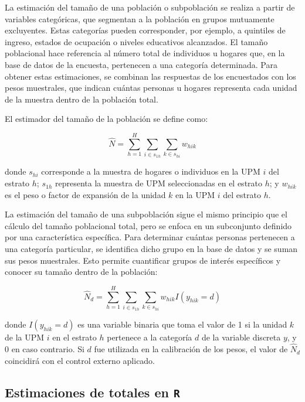 \documentclass[
  12pt,
]{book}
\begin{document}
La estimación del tamaño de una población o subpoblación se realiza a partir de variables categóricas, que segmentan a la población en grupos mutuamente excluyentes. Estas categorías pueden corresponder, por ejemplo, a quintiles de ingreso, estados de ocupación o niveles educativos alcanzados. El tamaño poblacional hace referencia al número total de individuos u hogares que, en la base de datos de la encuesta, pertenecen a una categoría determinada. Para obtener estas estimaciones, se combinan las respuestas de los encuestados con los pesos muestrales, que indican cuántas personas u hogares representa cada unidad de la muestra dentro de la población total.

El estimador del tamaño de la población se define como:

\[\hat{N} = \sum_{h=1}^{H} \sum_{i \in s_{1h}} \sum_{k \in s_{hi}} w_{hik}\]

donde \(s_{hi}\) corresponde a la muestra de hogares o individuos en la UPM \(i\) del estrato \(h\); \(s_{1h}\) representa la muestra de UPM seleccionadas en el estrato \(h\); y \(w_{hik}\) es el peso o factor de expansión de la unidad \(k\) en la UPM \(i\) del estrato \(h\).

La estimación del tamaño de una subpoblación sigue el mismo principio que el cálculo del tamaño poblacional total, pero se enfoca en un subconjunto definido por una característica específica. Para determinar cuántas personas pertenecen a una categoría particular, se identifica dicho grupo en la base de datos y se suman sus pesos muestrales. Esto permite cuantificar grupos de interés específicos y conocer su tamaño dentro de la población:

\[\hat{N}_d = \sum_{h=1}^{H} \sum_{i \in s_{1h}} \sum_{k \in s_{hi}} w_{hik} I(y_{hik}=d)\]

donde \(I(y_{hik}=d)\) es una variable binaria que toma el valor de 1 si la unidad \(k\) de la UPM \(i\) en el estrato \(h\) pertenece a la categoría \(d\) de la variable discreta \(y\), y 0 en caso contrario. Si \(d\) fue utilizada en la calibración de los pesos, el valor de \(\hat{N}_d\) coincidirá con el control externo aplicado.

\subsection*{\texorpdfstring{Estimaciones de totales en \texttt{R}}{Estimaciones de totales en R}}\label{estimaciones-de-totales-en-r}
\end{document}

